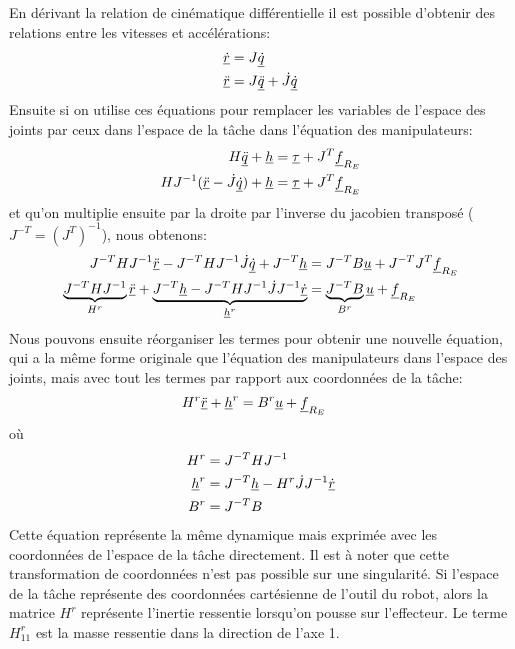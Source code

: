 En dérivant la relation de cinématique différentielle il est possible d'obtenir des relations entre les vitesses et accélérations:
\begin{align}
\underline{\dot{r}} &= J \underline{\dot{q}} \\
\underline{\ddot{r}} &= J \underline{\ddot{q}}  + \dot{J} \underline{\dot{q}} 
\end{align}
Ensuite si on utilise ces équations pour remplacer les variables de l'espace des joints par ceux dans l'espace de la tâche dans l'équation des manipulateurs:
\begin{align}
H \underline{\ddot{q}} + \underline{h} &= \underline{\tau} + J^T \underline{f}_{R_E} \\
H J^{-1} (\underline{\ddot{r}} - \dot{J} \underline{\dot{q}}) + \underline{h} &= \underline{\tau} + J^T \underline{f}_{R_E}
\end{align}
et qu'on multiplie ensuite par la droite par l'inverse du jacobien transposé ($J^{-T}=(J^T)^{-1}$), nous obtenons:
\begin{align}
J^{-T} H J^{-1} \underline{\ddot{r}} -  J^{-T} H J^{-1} \dot{J} \underline{\dot{q}} + J^{-T} \underline{h} &= J^{-T} B \underline{u} + J^{-T} J^T \underline{f}_{R_E} \\
\underbrace{
J^{-T} H J^{-1} 
}_{H^r}
\underline{\ddot{r}} +  
\underbrace{
J^{-T} \underline{h} 
-
J^{-T} H J^{-1} \dot{J} J^{-1} 
\underline{\dot{r}} 
}_{\underline{h}^r}
&= 
\underbrace{
J^{-T} 
B
}_{B^r}
\underline{u} + \underline{f}_{R_E} 
\end{align}
Nous pouvons ensuite réorganiser les termes pour obtenir une nouvelle équation, qui a la même forme originale que l'équation des manipulateurs dans l'espace des joints, mais avec tout les termes par rapport aux coordonnées de la tâche:
\begin{align}
H^r
\underline{\ddot{r}} +  
\underline{h}^r
&= B^{r} \underline{u} + \underline{f}_{R_E} 
\end{align}
où
\begin{align}
H^r & = J^{-T} H J^{-1} \\
\underline{h}^r & = J^{-T} \underline{h}  - H^r \dot{J} J^{-1} \underline{\dot{r}}  \\
B^r & = J^{-T} B
\end{align}
Cette équation représente la même dynamique mais exprimée avec les coordonnées de l'espace de la tâche directement. Il est à noter que cette transformation de coordonnées n'est pas possible sur une singularité. Si l'espace de la tâche représente des coordonnées cartésienne de l'outil du robot, alors la matrice $H^r$ représente l'inertie ressentie lorsqu'on pousse sur l'effecteur. Le terme $H^r_{11}$ est la masse ressentie dans la direction de l'axe 1. 




